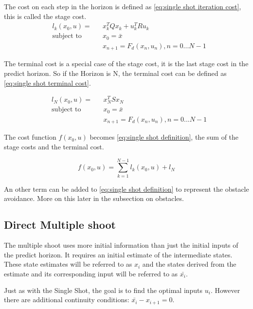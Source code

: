 			The cost on each step in the horizon is defined as \eqref{eq:single shot iteration cost}, this is called the stage cost.
			\begin{equation}
				\begin{aligned}
				& l_k(x_0,u) = &&  x_k^T Q x_k  +  u_k^T R u_k \\
				& \text{subject to}			&& x_0 = \bar{x} \\
				& 							&&  x_{n+1} = F_d(x_n,u_n), n=0...N-1
				\end{aligned}
				\label{eq:single shot iteration cost}
			\end{equation}
			
			The terminal cost is a special case of the stage cost, it is the last stage cost in the predict horizon. So if the Horizon is N, the terminal cost can be defined as \eqref{eq:single shot terminal cost}.
			
			\begin{equation}
				\begin{aligned}
					& l_N(x_0,u) = && x_N^TSx_N \\
					& \text{subject to}			&& x_0 = \bar{x} \\
					& 							&&  x_{n+1} = F_d(x_n,u_n), n=0...N-1
				\end{aligned}
				\label{eq:single shot terminal cost}
			\end{equation}
			
			The cost function $f(x_0,u)$ becomes \eqref{eq:single shot definition}, the sum of the stage costs and the terminal cost.
			
			\begin{equation}
				f(x_0,u) = \sum_{k=1}^{N-1} l_k(x_0,u) + l_N
				\label{eq:single shot definition}
			\end{equation}
			
			An other term can be added to \eqref{eq:single shot definition} to represent the obstacle avoidance. More on this later in the subsection on obstacles.
		\subsection{Direct Multiple shoot}
			The multiple shoot uses more initial information than just the initial inputs of the predict horizon. It requires an initial estimate of the intermediate states. These state estimates will be referred to as $x_i$ and the states derived from the estimate and its corresponding input will be referred to as $\bar{x_i}$. 
			
			Just as with the Single Shot, the goal is to find the optimal inputs $u_i$. However there are additional continuity conditions: $\bar{x_i} - x_{i+1} = 0$.
			
